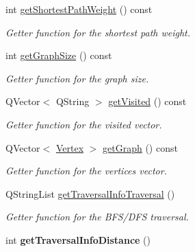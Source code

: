 \begin{DoxyCompactItemize}
int \hyperlink{class_graph_a63c083974789c0b7259339c574901228}{get\+Shortest\+Path\+Weight} () const
\begin{DoxyCompactList}\small\item\em Getter function for the shortest path weight. \end{DoxyCompactList}\item 
int \hyperlink{class_graph_af3da8365315d5435f490d48081cd5e42}{get\+Graph\+Size} () const
\begin{DoxyCompactList}\small\item\em Getter function for the graph size. \end{DoxyCompactList}\item 
Q\+Vector$<$ Q\+String $>$ \hyperlink{class_graph_a92dd89f52ca03428afe90a3ee99ece1e}{get\+Visited} () const
\begin{DoxyCompactList}\small\item\em Getter function for the visited vector. \end{DoxyCompactList}\item 
Q\+Vector$<$ \hyperlink{struct_vertex}{Vertex} $>$ \hyperlink{class_graph_a803afabcf8fd3f7ede5f547f1b61cccf}{get\+Graph} () const
\begin{DoxyCompactList}\small\item\em Getter function for the vertices vector. \end{DoxyCompactList}\item 
Q\+String\+List \hyperlink{class_graph_a27674fdc8baef9afe7406f067d56137c}{get\+Traversal\+Info\+Traversal} ()
\begin{DoxyCompactList}\small\item\em Getter function for the B\+F\+S/\+D\+FS traversal. \end{DoxyCompactList}\item 
\mbox{\label{class_graph_a40468766bbbfc36f01f34b8e9ee072f9}} 
int {\bfseries get\+Traversal\+Info\+Distance} ()
\end{DoxyCompactItemize}
